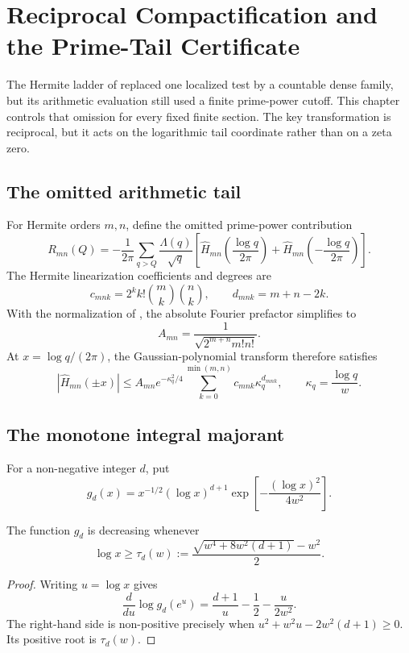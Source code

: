 \chapter{Reciprocal Compactification and the Prime-Tail Certificate}
\label{ch:prime-tail-certificate}

The Hermite ladder of  replaced one localized
test by a countable dense family, but its arithmetic evaluation still used a
finite prime-power cutoff. This chapter controls that omission for every
fixed finite section. The key transformation is reciprocal, but it acts on
the logarithmic tail coordinate rather than on a zeta zero.

\section{The omitted arithmetic tail}

For Hermite orders $m,n$, define the omitted prime-power contribution
\[
R_{mn}(Q)=-\frac1{2\pi}\sum_{q>Q}\frac{\Lambda(q)}{\sqrt q}
\left[
\widehat H_{mn}\!\left(\frac{\log q}{2\pi}\right)+
\widehat H_{mn}\!\left(-\frac{\log q}{2\pi}\right)
\right].
\]
The Hermite linearization coefficients and degrees are
\[
 c_{mnk}=2^k k!\binom mk\binom nk,
 \qquad
 d_{mnk}=m+n-2k.
\]
With the normalization of , the absolute
Fourier prefactor simplifies to
\[
 A_{mn}=\frac1{\sqrt{2^{m+n}m!n!}}.
\]
At $x=\log q/(2\pi)$, the Gaussian-polynomial transform therefore satisfies
\[
\left|\widehat H_{mn}(\pm x)\right|
\le A_{mn}e^{-\kappa_q^2/4}
\sum_{k=0}^{\min(m,n)}c_{mnk}\kappa_q^{d_{mnk}},
\qquad
\kappa_q=\frac{\log q}{w}.
\]

\section{The monotone integral majorant}

For a non-negative integer $d$, put
\[
 g_d(x)=x^{-1/2}(\log x)^{d+1}
 \exp\!\left[-\frac{(\log x)^2}{4w^2}\right].
\]

\begin{lemma}
\label{lem:tail-monotone-threshold}
The function $g_d$ is decreasing whenever
\[
 \log x\ge\tau_d(w)
 :=\frac{\sqrt{w^4+8w^2(d+1)}-w^2}{2}.
\]
\end{lemma}

\begin{proof}
Writing $u=\log x$ gives
\[
 \frac{d}{du}\log g_d(e^u)
 =\frac{d+1}{u}-\frac12-\frac{u}{2w^2}.
\]
The right-hand side is non-positive precisely when
$u^2+w^2u-2w^2(d+1)\ge0$. Its positive root is $\tau_d(w)$.
\end{proof}

